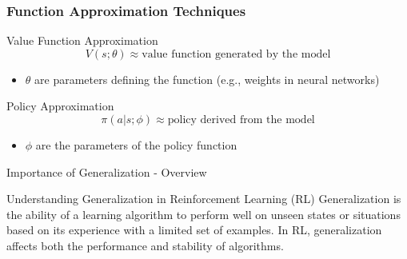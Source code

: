 \documentclass[aspectratio=169]{beamer}
\begin{document}
\begin{frame}[fragile]
    \frametitle{Function Approximation Techniques}
    \begin{block}{Value Function Approximation}
        \begin{equation}
            V(s; \theta) \approx \text{value function generated by the model}
        \end{equation}
        \begin{itemize}
            \item \( \theta \) are parameters defining the function (e.g., weights in neural networks)
        \end{itemize}
    \end{block}

    \begin{block}{Policy Approximation}
        \begin{equation}
            \pi(a|s; \phi) \approx \text{policy derived from the model}
        \end{equation}
        \begin{itemize}
            \item \( \phi \) are the parameters of the policy function
        \end{itemize}
    \end{block}
\end{frame}

\begin{frame}[fragile]{Importance of Generalization - Overview}
    \begin{block}{Understanding Generalization in Reinforcement Learning (RL)}
        Generalization is the ability of a learning algorithm to perform well on unseen states or situations based on its experience with a limited set of examples. In RL, generalization affects both the performance and stability of algorithms.
    \end{block}
\end{frame}
\end{document}
